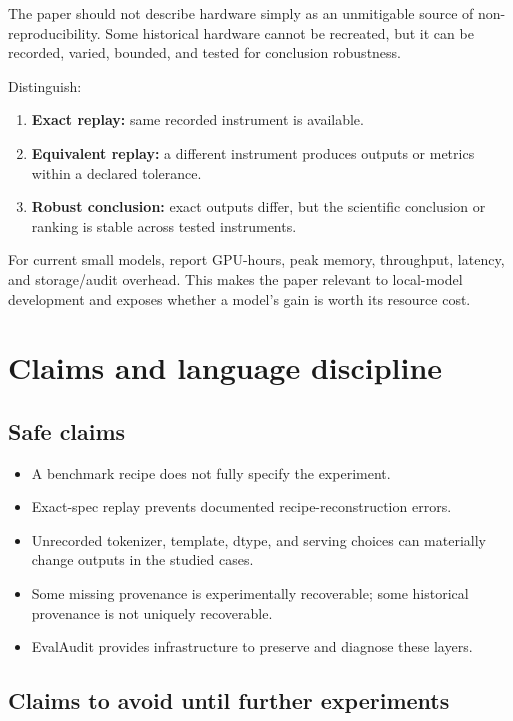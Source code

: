 \documentclass[11pt]{article}
\begin{document}
The paper should not describe hardware simply as an unmitigable source of non-reproducibility. Some historical hardware cannot be recreated, but it can be recorded, varied, bounded, and tested for conclusion robustness.

Distinguish:

\begin{enumerate}
  \item \textbf{Exact replay:} same recorded instrument is available.
  \item \textbf{Equivalent replay:} a different instrument produces outputs or metrics within a declared tolerance.
  \item \textbf{Robust conclusion:} exact outputs differ, but the scientific conclusion or ranking is stable across tested instruments.
\end{enumerate}

For current small models, report GPU-hours, peak memory, throughput, latency, and storage/audit overhead. This makes the paper relevant to local-model development and exposes whether a model's gain is worth its resource cost.

\section{Claims and language discipline}

\subsection{Safe claims}

\begin{itemize}
  \item A benchmark recipe does not fully specify the experiment.
  \item Exact-spec replay prevents documented recipe-reconstruction errors.
  \item Unrecorded tokenizer, template, dtype, and serving choices can materially change outputs in the studied cases.
  \item Some missing provenance is experimentally recoverable; some historical provenance is not uniquely recoverable.
  \item EvalAudit provides infrastructure to preserve and diagnose these layers.
\end{itemize}

\subsection{Claims to avoid until further experiments}
\end{document}
